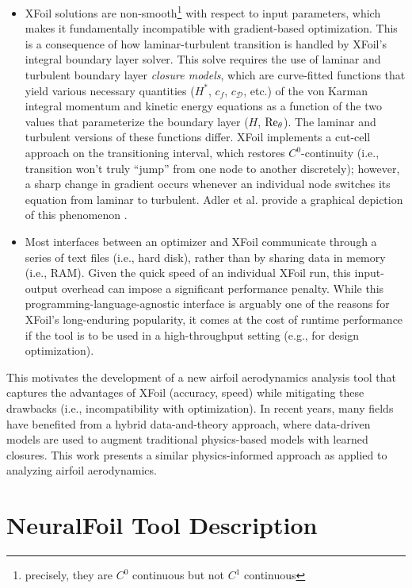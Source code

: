 \documentclass[conf]{new-aiaa}
\begin{document}
\begin{itemize}
        \item XFoil solutions are non-smooth\footnote{precisely, they are $C^0$ continuous but not $C^1$ continuous} with respect to input parameters, which makes it fundamentally incompatible with gradient-based optimization. This is a consequence of how laminar-turbulent transition is handled by XFoil's integral boundary layer solver. This solve requires the use of laminar and turbulent boundary layer \emph{closure models}, which are curve-fitted functions that yield various necessary quantities ($H^*$, $c_f$, $c_\mathcal{D}$, etc.) of the von Karman integral momentum and kinetic energy equations as a function of the two values that parameterize the boundary layer ($H$, $\rm Re_\theta$). The laminar and turbulent versions of these functions differ. XFoil implements a cut-cell approach on the transitioning interval, which restores $C^0$-continuity (i.e., transition won't truly ``jump'' from one node to another discretely); however, a sharp change in gradient occurs whenever an individual node switches its equation from laminar to turbulent. Adler et al. provide a graphical depiction of this phenomenon \cite{adler_cfd_2022}.
        \item Most interfaces between an optimizer and XFoil communicate through a series of text files (i.e., hard disk), rather than by sharing data in memory (i.e., RAM). Given the quick speed of an individual XFoil run, this input-output overhead can impose a significant performance penalty. While this programming-language-agnostic interface is arguably one of the reasons for XFoil's long-enduring popularity, it comes at the cost of runtime performance if the tool is to be used in a high-throughput setting (e.g., for design optimization).
    \end{itemize}

    This motivates the development of a new airfoil aerodynamics analysis tool that captures the advantages of XFoil (accuracy, speed) while mitigating these drawbacks (i.e., incompatibility with optimization). In recent years, many fields have benefited from a hybrid data-and-theory approach, where data-driven models are used to augment traditional physics-based models with learned closures. This work presents a similar physics-informed approach as applied to analyzing airfoil aerodynamics.



    \section{NeuralFoil Tool Description}
\end{document}
